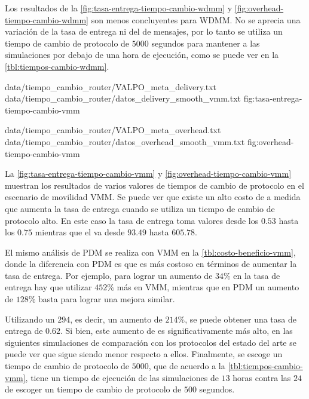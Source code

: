 Los resultados de la \ref{fig:tasa-entrega-tiempo-cambio-wdmm} y 
\ref{fig:overhead-tiempo-cambio-wdmm} son menos concluyentes para WDMM. No se
aprecia una variación de la tasa de entrega ni del \overhead{} de mensajes, por
lo tanto se utiliza un tiempo de cambio de protocolo de $5000$ segundos para
mantener a las simulaciones por debajo de una hora de ejecución, como se puede
ver en la \ref{tbl:tiempos-cambio-wdmm}.




{
{data/tiempo_cambio_router/VALPO_meta_delivery.txt}
{data/tiempo_cambio_router/datos_delivery_smooth_vmm.txt}
}{fig:tasa-entrega-tiempo-cambio-vmm}

{
{data/tiempo_cambio_router/VALPO_meta_overhead.txt}
{data/tiempo_cambio_router/datos_overhead_smooth_vmm.txt}
}{fig:overhead-tiempo-cambio-vmm}

La \ref{fig:tasa-entrega-tiempo-cambio-vmm} y
\ref{fig:overhead-tiempo-cambio-vmm} muestran los resultados de varios valores
de tiempos de cambio de protocolo en el escenario de movilidad VMM. Se puede ver
que existe un alto costo de \overhead{} a medida que aumenta la tasa de entrega
cuando se utiliza un tiempo de cambio de protocolo alto. En este caso la tasa de
entrega toma valores desde los $0.53$ hasta los $0.75$ mientras que el
\overhead{} va desde $93.49$ hasta $605.78$.


El mismo análisis de PDM se realiza con VMM en la \ref{tbl:costo-beneficio-vmm},
donde la diferencia con PDM es que es más costoso en términos de
\overhead{} aumentar la tasa de entrega. Por ejemplo, para lograr un aumento de
$34\%$ en la tasa de entrega hay que utilizar $452\%$ más \overhead{} en VMM,
mientras que en PDM un aumento de $128\%$ basta para lograr una mejora similar.

Utilizando un \overhead{} $294$, es decir, un aumento de $214\%$, se puede
obtener una tasa de entrega de $0.62$. Si bien, este aumento de \overhead{} es
significativamente más alto, en las siguientes simulaciones de comparación con
los protocolos del estado del arte se puede ver que sigue siendo menor respecto
a ellos. Finalmente, se escoge un tiempo de cambio de protocolo de $5000$, que
de acuerdo a la \ref{tbl:tiempos-cambio-vmm}, tiene un tiempo de ejecución de
las simulaciones de $13$ horas contra las $24$ de escoger un tiempo de cambio de
protocolo de $500$ segundos.





